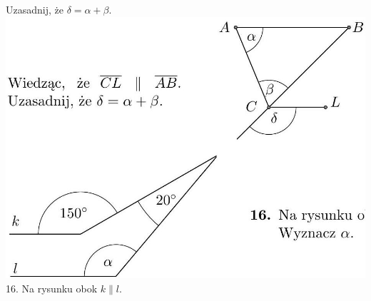 \documentclass[10pt]{article}
\begin{document}
Uzasadnij, że \(\delta=\alpha+\beta\).\\
\includegraphics[max width=\textwidth, center]{2024_11_21_71f62bd117d375398909g-015(1)}\\
16. Na rysunku obok \(k \| l\).
\end{document}
